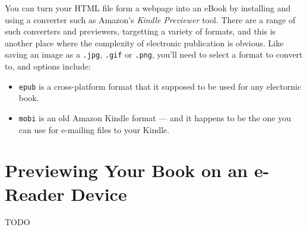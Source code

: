 You can turn your HTML file form a webpage into an eBook by installing
and using a converter such as Amazon's {\em Kindle Previewer} tool.
There are a range of such converters and previewers, targetting a
variety of formats, and this is another place where the complexity of
electronic publication is obvious. Like saving an image as a
\texttt{.jpg}, \texttt{.gif} or \texttt{.png}, you'll need to select a
format to convert to, and options include:

\begin{itemize}
  \item \texttt{epub} is a cross-platform format that it supposed to
    be used for any electornic book.
  \item \texttt{mobi} is an old Amazon Kindle format --- and it
    happens to be the one you can use for e-mailing files to your Kindle.
\end{itemize}

\section{Previewing Your Book on an e-Reader Device}

TODO



